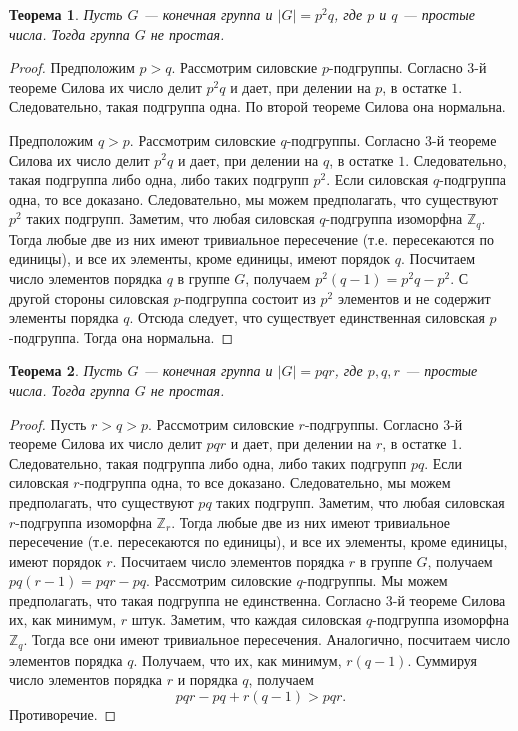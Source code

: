 \documentclass[12pt, titlepage, oneside]{amsbook}
\newcommand{\ZZ}{\mathbb{Z}}
\newtheorem{theorem}{Теорема}[chapter]
\theoremstyle{definition}
\theoremstyle{remark}
\begin{document}
\begin{theorem}
\label{Pr2} Пусть $G$ --- конечная группа и $|G|=p^2q$, где
$p$ и $q$ --- простые числа. Тогда группа $G$ не простая.
\end{theorem}

\begin{proof}
Предположим  $p>q$. Рассмотрим силовские $p$-подгруппы. Согласно 3-й теореме Силова их число делит $p^2q$ и дает, при делении на $p$, в остатке $1$. Следовательно, такая подгруппа одна. По второй теореме Силова она нормальна.

Предположим  $q>p$. Рассмотрим силовские $q$-подгруппы. Согласно 3-й теореме Силова их число делит $p^2q$ и дает, при делении на $q$, в остатке $1$. Следовательно, такая подгруппа либо одна, либо таких подгрупп $p^2$. Если силовская $q$-подгруппа одна, то все доказано. Следовательно, мы можем предполагать, что существуют $p^2$ таких подгрупп. Заметим, что любая силовская $q$-подгруппа изоморфна $\ZZ_q$. Тогда любые две из них имеют тривиальное пересечение (т.е. пересекаются по единицы), и все их элементы, кроме единицы, имеют порядок $q$. Посчитаем число элементов порядка $q$ в группе $G$, получаем $p^2(q-1)=p^2q-p^2$. С другой стороны силовская $p$-подгруппа состоит из $p^2$ элементов и не содержит элементы порядка $q$. Отсюда следует, что существует единственная силовская $p$-подгруппа. Тогда она нормальна.
\end{proof}

\begin{theorem}
\label{Pr3} Пусть $G$ --- конечная группа и $|G|=pqr$, где
$p,q,r$ --- простые числа. Тогда группа $G$ не простая.
\end{theorem}

\begin{proof}
Пусть $r>q>p$. Рассмотрим силовские $r$-подгруппы. Согласно 3-й теореме Силова их число делит $pqr$ и дает, при делении на $r$, в остатке $1$. Следовательно, такая подгруппа либо одна, либо таких подгрупп $pq$. Если силовская $r$-подгруппа одна, то все доказано. Следовательно, мы можем предполагать, что существуют $pq$ таких подгрупп. Заметим, что любая силовская $r$-подгруппа изоморфна $\ZZ_r$. Тогда любые две из них имеют тривиальное пересечение (т.е. пересекаются по единицы), и все их элементы, кроме единицы, имеют порядок $r$. Посчитаем число элементов порядка $r$ в группе $G$, получаем $pq(r-1)=pqr-pq$. Рассмотрим силовские $q$-подгруппы. Мы можем предполагать, что такая подгруппа не единственна. Согласно 3-й теореме Силова их, как минимум, $r$ штук. Заметим, что каждая силовская $q$-подгруппа изоморфна $\ZZ_q$. Тогда все они имеют тривиальное пересечения. Аналогично, посчитаем число элементов порядка $q$. Получаем, что их, как минимум, $r(q-1)$. Суммируя число элементов порядка $r$ и порядка $q$, получаем $$pqr-pq+r(q-1)>pqr.$$ Противоречие.
\end{proof}
\end{document}
